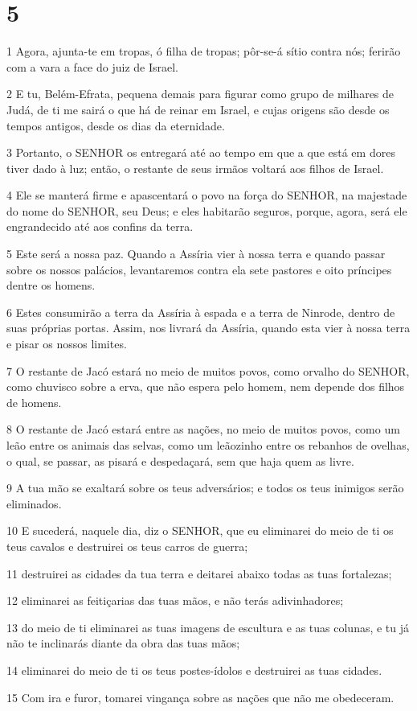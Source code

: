 \chapter{5}

\par 1 Agora, ajunta-te em tropas, ó filha de tropas; pôr-se-á sítio contra nós; ferirão com a vara a face do juiz de Israel.
\par 2 E tu, Belém-Efrata, pequena demais para figurar como grupo de milhares de Judá, de ti me sairá o que há de reinar em Israel, e cujas origens são desde os tempos antigos, desde os dias da eternidade.
\par 3 Portanto, o SENHOR os entregará até ao tempo em que a que está em dores tiver dado à luz; então, o restante de seus irmãos voltará aos filhos de Israel.
\par 4 Ele se manterá firme e apascentará o povo na força do SENHOR, na majestade do nome do SENHOR, seu Deus; e eles habitarão seguros, porque, agora, será ele engrandecido até aos confins da terra.
\par 5 Este será a nossa paz. Quando a Assíria vier à nossa terra e quando passar sobre os nossos palácios, levantaremos contra ela sete pastores e oito príncipes dentre os homens.
\par 6 Estes consumirão a terra da Assíria à espada e a terra de Ninrode, dentro de suas próprias portas. Assim, nos livrará da Assíria, quando esta vier à nossa terra e pisar os nossos limites.
\par 7 O restante de Jacó estará no meio de muitos povos, como orvalho do SENHOR, como chuvisco sobre a erva, que não espera pelo homem, nem depende dos filhos de homens.
\par 8 O restante de Jacó estará entre as nações, no meio de muitos povos, como um leão entre os animais das selvas, como um leãozinho entre os rebanhos de ovelhas, o qual, se passar, as pisará e despedaçará, sem que haja quem as livre.
\par 9 A tua mão se exaltará sobre os teus adversários; e todos os teus inimigos serão eliminados.
\par 10 E sucederá, naquele dia, diz o SENHOR, que eu eliminarei do meio de ti os teus cavalos e destruirei os teus carros de guerra;
\par 11 destruirei as cidades da tua terra e deitarei abaixo todas as tuas fortalezas;
\par 12 eliminarei as feitiçarias das tuas mãos, e não terás adivinhadores;
\par 13 do meio de ti eliminarei as tuas imagens de escultura e as tuas colunas, e tu já não te inclinarás diante da obra das tuas mãos;
\par 14 eliminarei do meio de ti os teus postes-ídolos e destruirei as tuas cidades.
\par 15 Com ira e furor, tomarei vingança sobre as nações que não me obedeceram.

